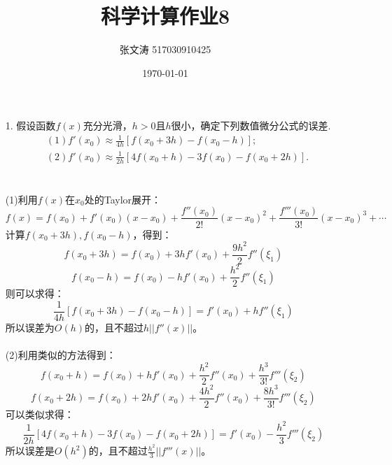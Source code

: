 \documentclass{article}
\title{科学计算作业8}
\author{张文涛 517030910425}
\date{\today}
\begin{document}
	\maketitle
	\begin{itemize}
		\item[1.]假设函数$f(x)$充分光滑，$h > 0$且$h$很小，确定下列数值微分公式的误差.
		\begin{align*}
		&(1)f'(x_0)\approx \frac{1}{4h}[f(x_0 + 3h)-f(x_0 - h)];\\
		&(2)f'(x_0)\approx \frac{1}{2h}[4f(x_0 + h) - 3f(x_0) - f(x_0 + 2h)].
		\end{align*}\\\\
		(1)利用$f(x)$在$x_0$处的Taylor展开：
		$$f(x) = f(x_0) + f'(x_0)(x - x_0) + \frac{f''(x_0)}{2!}(x - x_0)^2 + \frac{f'''(x_0)}{3!}(x - x_0)^3+\cdots$$
		计算$f(x_0 + 3h),f(x_0 - h)$，得到：
		$$
			f(x_0 + 3h) =  f(x_0) + 3hf'(x_0) + \frac{9h^2}{2}f''(\xi_1)
		$$
		$$
			f(x_0 -h) = f(x_0) - hf'(x_0) + \frac{h^2}{2}f''(\xi_1)
		$$
		则可以求得：
		$$
			 \frac{1}{4h}[f(x_0 + 3h)-f(x_0 - h)] = f'(x_0) + hf''(\xi_1)
		$$
		所以误差为$O(h)$的，且不超过$h||f''(x)||$。\\\\
		(2)利用类似的方法得到：
		$$
			f(x_0 + h)  =  f(x_0) + hf'(x_0) + \frac{h^2}{2}f''(x_0) + \frac{h^3}{3!}f'''(\xi_2)
		$$
		$$
			f(x_0 + 2h) = f(x_0 ) + 2hf'(x_0) + \frac{4h^2}{2}f''(x_0) + \frac{8h^3}{3!}f'''(\xi_2)
		$$
		可以类似求得：
		$$
			\frac{1}{2h}[4f(x_0 + h) - 3f(x_0) - f(x_0 + 2h)] = f'(x_0) - \frac{h^2}{3}f'''(\xi_2)
		$$
		所以误差是$O(h^2)$的，且不超过$\frac{h^2}{3}||f'''(x)||$。\\\\
		

\end{itemize}
\end{document}
